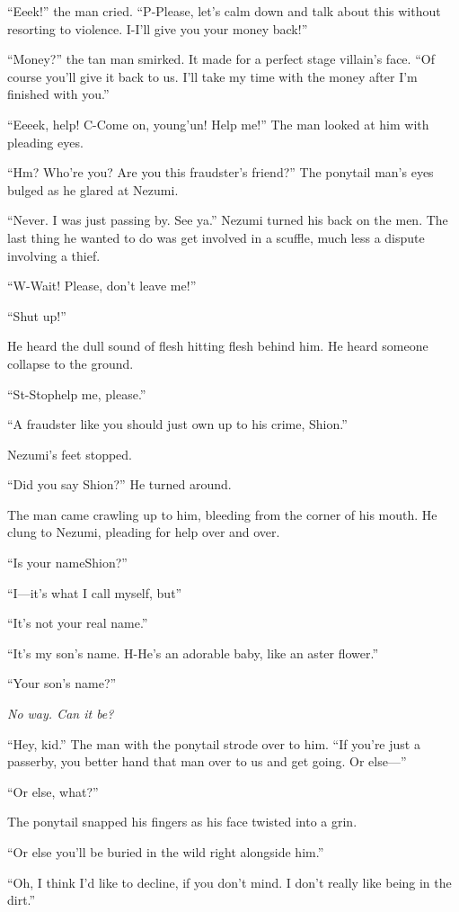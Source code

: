 ``Eeek!'' the man cried. ``P-Please, let's calm down and talk about this
without resorting to violence. I-I'll give you your money back!''

``Money?'' the tan man smirked. It made for a perfect stage villain's
face. ``Of course you'll give it back to us. I'll take my time with the
money after I'm finished with you.''

``Eeeek, help! C-Come on, young'un! Help me!'' The man looked at him
with pleading eyes.

``Hm? Who're you? Are you this fraudster's friend?'' The ponytail man's
eyes bulged as he glared at Nezumi.

``Never. I was just passing by. See ya.'' Nezumi turned his back on the
men. The last thing he wanted to do was get involved in a scuffle, much
less a dispute involving a thief.

``W-Wait! Please, don't leave me!''

``Shut up!''

He heard the dull sound of flesh hitting flesh behind him. He heard
someone collapse to the ground.

``St-Stop\el help me, please.''

``A fraudster like you should just own up to his crime, Shion.''

Nezumi's feet stopped.

``Did you say Shion?'' He turned around.

The man came crawling up to him, bleeding from the corner of his mouth.
He clung to Nezumi, pleading for help over and over.

``Is your name\el Shion?''

``I---it's what I call myself, but\el ''

``It's not your real name.''

``It's my son's name. H-He's an adorable baby, like an aster flower.''

``Your son's name?''

\emph{No way. Can it be?}

``Hey, kid.'' The man with the ponytail strode over to him. ``If you're
just a passerby, you better hand that man over to us and get going. Or
else---''

``Or else, what?''

The ponytail snapped his fingers as his face twisted into a grin.

``Or else you'll be buried in the wild right alongside him.''

``Oh, I think I'd like to decline, if you don't mind. I don't really
like being in the dirt.''

